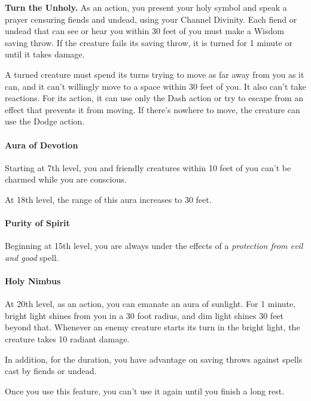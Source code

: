 \documentclass[
]{article}
\begin{document}
\textbf{Turn the Unholy.} As an action, you present your holy symbol and
speak a prayer censuring fiends and undead, using your Channel Divinity.
Each fiend or undead that can see or hear you within 30 feet of you must
make a Wisdom saving throw. If the creature fails its saving throw, it
is turned for 1 minute or until it takes damage.

A turned creature must spend its turns trying to move as far away from
you as it can, and it can't willingly move to a space within 30 feet of
you. It also can't take reactions. For its action, it can use only the
Dash action or try to escape from an effect that prevents it from
moving. If there's nowhere to move, the creature can use the Dodge
action.

\hypertarget{aura-of-devotion}{%
\paragraph{Aura of Devotion}\label{aura-of-devotion}}

Starting at 7th level, you and friendly creatures within 10 feet of you
can't be charmed while you are conscious.

At 18th level, the range of this aura increases to 30 feet.

\hypertarget{purity-of-spirit}{%
\paragraph{Purity of Spirit}\label{purity-of-spirit}}

Beginning at 15th level, you are always under the effects of a
\emph{protection from evil and good} spell.

\hypertarget{holy-nimbus}{%
\paragraph{Holy Nimbus}\label{holy-nimbus}}

At 20th level, as an action, you can emanate an aura of sunlight. For 1
minute, bright light shines from you in a 30 foot radius, and dim light
shines 30 feet beyond that. Whenever an enemy creature starts its turn
in the bright light, the creature takes 10 radiant damage.

In addition, for the duration, you have advantage on saving throws
against spells cast by fiends or undead.

Once you use this feature, you can't use it again until you finish a
long rest.
\end{document}
